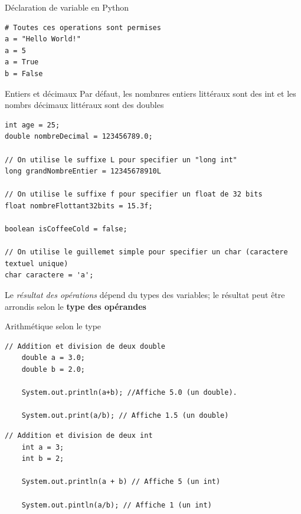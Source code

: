 \documentclass{report}
\begin{document}
\begin{EExample*}{Déclaration de variable en Python}{}
\begin{lstlisting}[style=PythonDraculaWhite]
# Toutes ces operations sont permises 
a = "Hello World!"
a = 5
a = True
b = False 
\end{lstlisting}	
\end{EExample*}

\begin{Remarque*}{Entiers et décimaux}{}
Par défaut, les nombnres entiers littéraux sont des int et les nombrs décimaux littéraux sont des doubles 
\end{Remarque*}
\begin{EExample*}{}{}
\begin{lstlisting}[style=JavaDraculaWhite]
int age = 25;
double nombreDecimal = 123456789.0;

// On utilise le suffixe L pour specifier un "long int"
long grandNombreEntier = 12345678910L

// On utilise le suffixe f pour specifier un float de 32 bits
float nombreFlottant32bits = 15.3f;

boolean isCoffeeCold = false;

// On utilise le guillemet simple pour specifier un char (caractere textuel unique)
char caractere = 'a'; 

\end{lstlisting}
\end{EExample*}

\begin{note}
	Le \textit{résultat des opérations} dépend du types des variables; le résultat peut être arrondis selon le \textbf{type des opérandes} 
\end{note}


\begin{EExample*}{Arithmétique selon le type}{}
\begin{lstlisting}[style=JavaDraculaWhite]
	// Addition et division de deux double
	double a = 3.0;
	double b = 2.0;

	System.out.println(a+b); //Affiche 5.0 (un double). 

	System.out.print(a/b); // Affiche 1.5 (un double)
\end{lstlisting}

\begin{lstlisting}[style=JavaDraculaWhite]
	// Addition et division de deux int
	int a = 3;
	int b = 2;

	System.out.println(a + b) // Affiche 5 (un int)

	System.out.pintln(a/b); // Affiche 1 (un int)
\end{lstlisting}
\end{EExample*}
\end{document}
